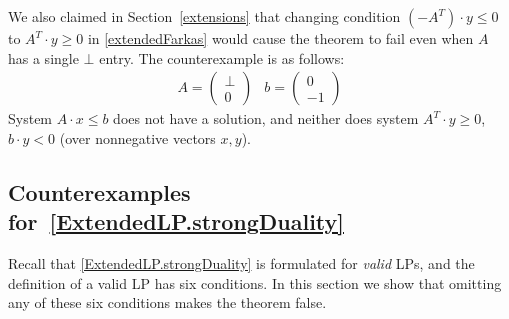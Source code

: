\documentclass[]{article}
\renewcommand{\.}{\hskip .75pt}
\newcommand{\sekt}[1]{Section~\ref{#1}}
\let\*=\cdot
\begin{document}
We also claimed in \sekt{extensions} that changing condition $(-A^T) \* y \le 0$
to  $A^T \* y \ge 0$ in  \ref{extendedFarkas} would cause the theorem
to fail even when $A$ has a single $\bot$ entry. The counterexample is as follows:
$$
\begin{array}{cc}
A =
\begin{pmatrix}
	\bot  \\
	0 
\end{pmatrix}
&
b = \begin{pmatrix} 0 \\ -1 \end{pmatrix}
\end{array}
$$
System $A \* x\le b$ does not have a solution, and neither does system $A^T \* y \ge 0$, $b \* y < 0$
(over nonnegative vectors $x,y$).

\subsection{Counterexamples for~\ref{ExtendedLP.strongDuality}}\label{sec:ExtendedLP.strongDuality:counterexamples}
Recall that \ref{ExtendedLP.strongDuality} is formulated for {\em valid} LPs,
and the definition of a valid LP has six conditions.
In this section we show that omitting any of these six conditions
makes the theorem false.
\end{document}
